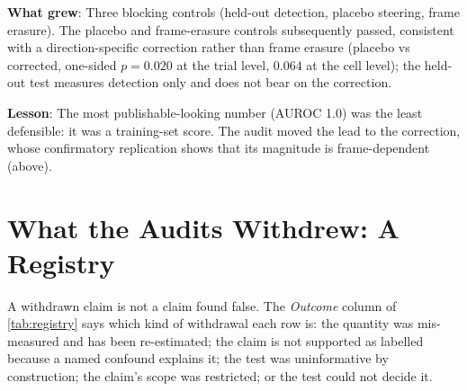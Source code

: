 \documentclass[11pt,letterpaper]{article}
\begin{document}
\textbf{What grew}: Three blocking controls (held-out detection, placebo steering, frame
erasure). The placebo and frame-erasure controls subsequently passed, consistent with a direction-specific correction rather than frame erasure (placebo vs corrected, one-sided $p=0.020$ at the trial level, $0.064$ at the cell level); the held-out test measures detection only and does not bear on the correction.

\textbf{Lesson}: The most publishable-looking number (AUROC 1.0) was the least defensible: it was a
training-set score. The audit moved the lead to the correction, whose confirmatory replication shows
that its magnitude is frame-dependent (above).

\section{What the Audits Withdrew: A Registry}\label{sec:registry}

A withdrawn claim is not a claim found false. The \emph{Outcome} column of \cref{tab:registry} says
which kind of withdrawal each row is: the quantity was mis-measured and has been re-estimated; the
claim is not supported as labelled because a named confound explains it; the test was uninformative
by construction; the claim's scope was restricted; or the test could not decide it.
\end{document}

